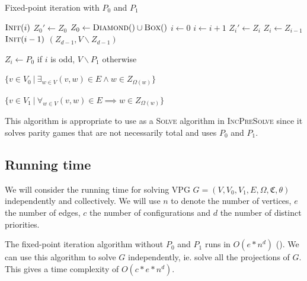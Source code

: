 \begin{algorithm}
	\caption{Fixed-point iteration with $P_0$ and $P_1$}
	\label{alg_FPITE}
	\begin{multicols}{2}
		\begin{algorithmic}[1]
					\State $\textsc{Init}(i)$
				\EndFor
				\Repeat
					\State $Z_0'\gets Z_0$
					\State $Z_0 \gets \textsc{Diamond}() \cup \textsc{Box}()$
					\State $i \gets 0$
						\State $i \gets i+1$
						\State $Z_i' \gets Z_i$
						\State $Z_i \gets Z_{i-1}$
						\State $\textsc{Init}(i-1)$
					\EndWhile
				\State \Return $(Z_{d-1},V\backslash Z_{d-1})$
			\EndFunction
		\end{algorithmic}\bigskip\bigskip
		\begin{algorithmic}[1]
			\Function{Init}{$i$}
				\State $Z_i \gets P_0$ if $i$ is odd, $V\backslash P_1$ otherwise
			\EndFunction
		\end{algorithmic}\bigskip
		\begin{algorithmic}[1]
			\Function{Diamond}{}
				\State \Return $\{ v \in V_0\ |\ \exists_{w\in V} (v,w) \in E \wedge w \in Z_{\Omega(w)}\}$
			\EndFunction
		\end{algorithmic}\bigskip
		\begin{algorithmic}[1]
			\Function{Box}{}
			\State \Return $\{ v \in V_1\ |\ \forall_{w\in V} (v,w) \in E \implies w \in Z_{\Omega(w)}\}$
			\EndFunction
		\end{algorithmic}
	\end{multicols}
\end{algorithm}

This algorithm is appropriate to use as a \textsc{Solve} algorithm in \textsc{IncPreSolve} since it solves parity games that are not necessarily total and uses $P_0$ and $P_1$.

\subsection{Running time}
We will consider the running time for solving VPG $G = (V,V_0,V_1,E,\Omega,\mathfrak{C},\theta)$ independently and collectively. We will use $n$ to denote the number of vertices, $e$ the number of edges, $c$ the number of configurations and $d$ the number of distinct priorities.

The fixed-point iteration algorithm without $P_0$ and $P_1$ runs in $O(e*n^d)$ (\cite{FPITE}). We can use this algorithm to solve $G$ independently, ie. solve all the projections of $G$. This gives a time complexity of $O(c*e*n^d)$.

